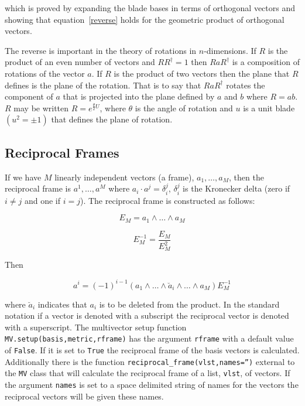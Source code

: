 \documentclass[10pt]{article}
\newcommand{\bfrac}[2]{\displaystyle\frac{#1}{#2}}
\newcommand{\lp}{\left (}
\newcommand{\rp}{\right )}
\newcommand{\W}{\wedge}
\newcommand{\R}{\dagger}
\newcommand{\T}[1]{\texttt{#1}}
\begin{document}
which is proved by expanding the blade bases in terms of orthogonal vectors and
showing that equation~\ref{reverse} holds for the geometric product of orthogonal
vectors.

The reverse is important in the theory of rotations in $n$-dimensions.  If
$R$ is the product of an even number of vectors and $RR^{\R} = 1$
then $RaR^{\R}$ is a composition of rotations of the vector $a$.
If $R$ is the product of two vectors then the plane that $R$ defines
is the plane of the rotation.  That is to say that $RaR^{\R}$ rotates the
component of $a$ that is projected into the plane defined by $a$ and
$b$ where $R=ab$. $R$ may be written
$R = e^{\frac{\theta}{2}U}$, where $\theta$ is the angle of rotation
and $u$ is a unit blade $\lp u^{2} = \pm 1\rp$ that defines the
plane of rotation.

\subsection{Reciprocal Frames}

If we have $M$ linearly independent vectors (a frame),
$a_{1},\dots,a_{M}$, then the reciprocal frame is
$a^{1},\dots,a^{M}$ where $a_{i}\cdot a^{j} = \delta_{i}^{j}$,
$\delta_{i}^{j}$ is the Kronecker delta (zero if $i \ne j$ and one
if $i = j$). The reciprocal frame is constructed as follows:

  \begin{equation}
    E_{M} = a_{1}\W\dots\W a_{M}
  \end{equation}

  \begin{equation}
    E_{M}^{-1} = \bfrac{E_{M}}{E_{M}^{2}}
  \end{equation}

Then

  \begin{equation}
    a^{i} = \lp -1\rp^{i-1}\lp a_{1}\W\dots\W \breve{a}_{i} \W\dots\W a_{M}\rp E_{M}^{-1}
  \end{equation}

where $\breve{a}_{i}$ indicates that $a_{i}$ is to be deleted from
the product.  In the standard notation if a vector is denoted with a subscript
the reciprocal vector is denoted with a superscript. The multivector setup
function \T{MV.setup(basis,metric,rframe)} has the argument \T{rframe} with a
default value of \T{False}.  If it is set to \T{True} the reciprocal frame of
the basis vectors is calculated. Additionally there is the function
\T{reciprocal\_frame(vlst,names='')} external to the \T{MV} class that will
calculate the reciprocal frame of a list, \T{vlst}, of vectors.  If the argument
\T{names} is set to a space delimited string of names for the vectors the
reciprocal vectors will be given these names.
\end{document}
